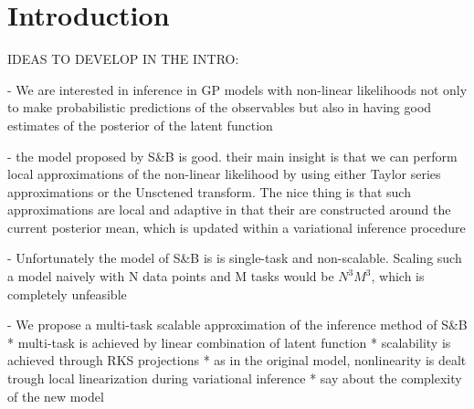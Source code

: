 \section{Introduction}
% 

IDEAS TO DEVELOP IN THE INTRO:

\citet{steinberg-bonilla-nips-2014}


- We are interested in inference in GP models with non-linear likelihoods
not only to make probabilistic predictions of the observables but also in having
good estimates of the posterior of the latent function

- the model proposed by S\&B \citep{steinberg-bonilla-nips-2014}
  is good. their main insight is that we can perform 
local approximations of the non-linear likelihood by using either Taylor series 
approximations  or the Unsctened transform. The nice thing is that such approximations
are local and adaptive in that their are constructed around the current posterior 
mean, which is updated within a variational inference procedure 

- Unfortunately the model of S\&B is  is single-task and non-scalable. 
Scaling such a model naively with N data points and M tasks would be $N^3M^3$,
which is completely unfeasible

- We propose a multi-task scalable approximation of  the inference method of S\&B 
* multi-task is achieved by linear combination of latent function
* scalability is achieved through RKS  projections 
* as in the original model, nonlinearity is dealt trough local linearization during 
variational inference
* say about the complexity of the new model 




